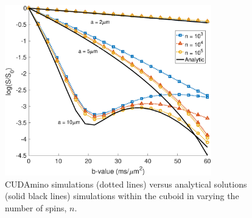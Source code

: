 




\begin{figure}
  \centering
  \includegraphics[width=0.8\textwidth]{figures/cudamino/new/cuboid_all_cudamino_nspin_no_1mil.eps}
  \caption[CUDAmino simulations versus analytic solutions for varying $n$.]{CUDAmino simulations (dotted lines) versus analytical solutions (solid black lines) simulations within the cuboid in  varying the number of spins, $n$.}
  \label{fig:cuboid_cudamino_nspin}
\end{figure}

